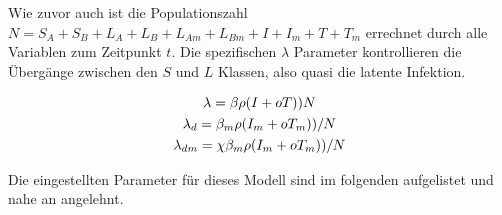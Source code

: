 \documentclass[paper=a4, fontsize=11pt, ngerman, abstract=on]{scrartcl}
\numberwithin{equation}{section} %
\numberwithin{figure}{section} %
\numberwithin{table}{section} %
\begin{document}
Wie zuvor auch ist die Populationszahl $N = S_{A} + S_{B} + L_{A} + L_{B} + L_{Am} + L_{Bm} + I + I_{m} + T + T_{m}$ errechnet durch alle Variablen zum Zeitpunkt $t$. Die spezifischen $\lambda$ Parameter kontrollieren die Übergänge zwischen den $S$ und $L$ Klassen, also quasi die latente Infektion.

\begin{gather*}
  \lambda = \beta \rho (I + oT)) \/ N \\
  \lambda _{d} = \beta_{m} \rho (I_{m} + oT_{m})) / N \\
  \lambda _{dm} = \chi\beta_{m} \rho (I_{m} + oT_{m})) / N \\
\end{gather*}

Die eingestellten Parameter für dieses Modell sind im folgenden aufgelistet und nahe an \cite{Trauer2014} angelehnt.
\end{document}
